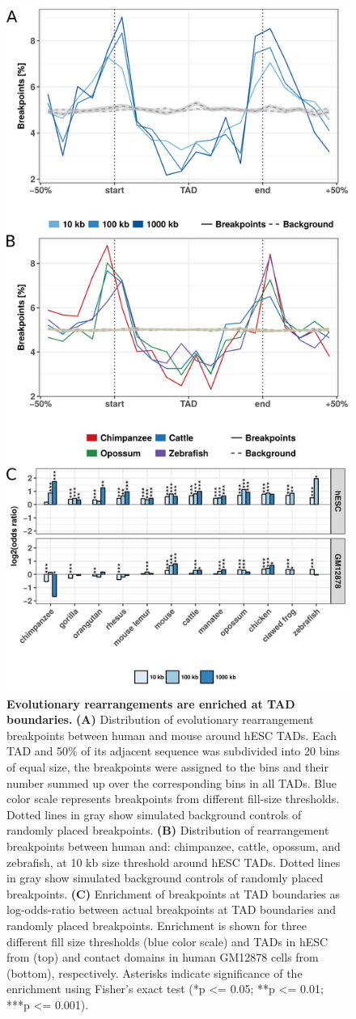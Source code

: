 \documentclass[a4paper,twoside=true,openright,parskip=full,chapterprefix=true,11pt,headings=normal,bibliography=totoc,listof=totoc,titlepage=on,captions=tableabove,draft=false]{scrreprt}
\theoremstyle{definition}
\theoremstyle{definition}
\theoremstyle{definition}
\theoremstyle{remark}
\begin{document}
\begin{figure}

{\centering \includegraphics[width=0.5\linewidth]{figures/TAD_evolution/fig2_v02} 

}

\caption{\textbf{Evolutionary rearrangements are enriched at TAD
boundaries.} \textbf{(A)} Distribution of evolutionary rearrangement
breakpoints between human and mouse around hESC TADs. Each TAD and 50\%
of its adjacent sequence was subdivided into 20 bins of equal size, the
breakpoints were assigned to the bins and their number summed up over
the corresponding bins in all TADs. Blue color scale represents
breakpoints from different fill-size thresholds. Dotted lines in gray
show simulated background controls of randomly placed breakpoints.
\textbf{(B)} Distribution of rearrangement breakpoints between human
and: chimpanzee, cattle, opossum, and zebrafish, at 10 kb size threshold
around hESC TADs. Dotted lines in gray show simulated background
controls of randomly placed breakpoints. \textbf{(C)} Enrichment of
breakpoints at TAD boundaries as log-odds-ratio between actual
breakpoints at TAD boundaries and randomly placed breakpoints.
Enrichment is shown for three different fill size thresholds (blue color
scale) and TADs in hESC from \citep{Dixon2012} (top) and contact domains
in human GM12878 cells from \citep{Rao2014} (bottom), respectively.
Asterisks indicate significance of the enrichment using Fisher's exact
test (*p \textless{}= 0.05; **p \textless{}= 0.01; ***p \textless{}=
0.001).}\label{fig:TadEvo2}
\end{figure}
\end{document}
